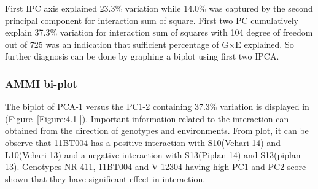 First IPC axis explained 23.3\% variation while 14.0\% was captured by the second principal component for interaction sum of square.  First two PC cumulatively explain 37.3\% variation for interaction sum of squares with 104 degree of freedom out of 725  was an indication that sufficient percentage of G$\times$E explained. So further diagnosis can be done by graphing a biplot using first two IPCA. 

\subsubsection{AMMI bi-plot}
The biplot of PCA-1 versus the PC1-2 containing 37.3\% variation is displayed in (Figure~\ref{Figure:4.1 }). Important information related to the interaction can obtained from the direction of genotypes and environments. From plot, it can be observe that  11BT004  has a positive interaction with S10(Vehari-14) and L10(Vehari-13) and a negative interaction with S13(Piplan-14) and S13(piplan-13). Genotypes NR-411, 11BT004 and V-12304 having high PC1 and PC2 score shown that they have significant effect in interaction.
